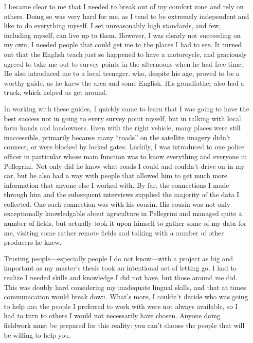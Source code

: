 {I became clear to me that I needed to break out of my comfort zone and rely on others. Doing so was very hard for me, as I tend to be extremely independent and like to do everything myself. I set unreasonably high standards, and few, including myself, can live up to them. However, I was clearly not succeeding on my own; I needed people that could get me to the places I had to see. It turned out that the English teach just so happened to have a motorcycle, and graciously agreed to take me out to survey points in the afternoons when he had free time. He also introduced me to a local teenager, who, despite his age, proved to be a worthy guide, as he knew the area and some English. His grandfather also had a truck, which helped us get around.

In working with these guides, I quickly came to learn that I was going to have the best success not in going to every survey point myself, but in talking with local farm hands and landowners. Even with the right vehicle, many places were still inaccessible, primarily because many “roads” on the satellite imagery didn’t connect, or were blocked by locked gates. Luckily, I was introduced to one police officer in particular whose main function was to know everything and everyone in Pellegrini. Not only did he know what roads I could and couldn’t drive on in my car, but he also had a way with people that allowed him to get much more information that anyone else I worked with. By far, the connections I made through him and the subsequent interviews supplied the majority of the data I collected. One such connection was with his cousin. His cousin was not only exceptionally knowledgable about agriculture in Pellegrini and managed quite a number of fields, but actually took it upon himself to gather some of my data for me, visiting some rather remote fields and talking with a number of other producers he knew.

Trusting people—especially people I do not know—with a project as big and important as my master’s thesis took an intentional act of letting go. I had to realize I needed skills and knowledge I did not have, but those around me did. This was doubly hard considering my inadequate lingual skills, and that at times communication would break down. What’s more, I couldn’t decide who was going to help me; the people I preferred to work with were not always available, so I had to turn to others I would not necessarily have chosen. Anyone doing fieldwork must be prepared for this reality: you can’t choose the people that will be willing to help you.

}
